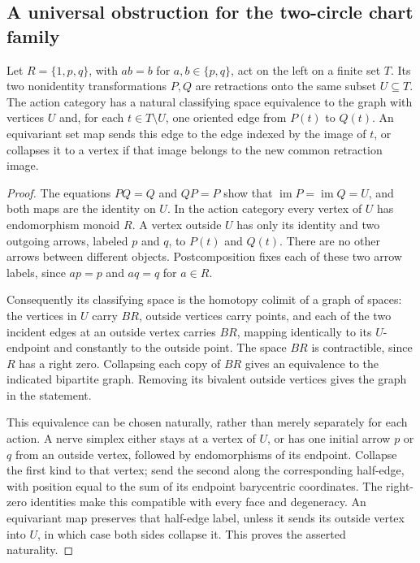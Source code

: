 \subsection{A universal obstruction for the two-circle chart family}

\begin{lemma}
\label{C:right-zero-action-graph}
Let $R=\{1,p,q\}$, with $ab=b$ for $a,b\in\{p,q\}$,
act on the left on a finite set $T$.  Its two nonidentity
transformations $P,Q$ are retractions onto the same subset
$U\subseteq T$.  The action category has a natural classifying
space equivalence to the graph with vertices $U$ and, for each
$t\in T\setminus U$, one oriented edge from $P(t)$ to $Q(t)$.
An equivariant set map sends this edge to the edge indexed by
the image of $t$, or collapses it to a vertex if that image
belongs to the new common retraction image.
\end{lemma}
\begin{proof}
The equations $PQ=Q$ and $QP=P$ show that
$\operatorname{im}P=\operatorname{im}Q=U$, and both maps
are the identity on $U$.  In the action category every vertex
of $U$ has endomorphism monoid $R$.  A vertex outside $U$ has
only its identity and two outgoing arrows, labeled $p$ and $q$,
to $P(t)$ and $Q(t)$.  There are no other arrows between
different objects.  Postcomposition fixes each of these two
arrow labels, since $ap=p$ and $aq=q$ for $a\in R$.

Consequently its classifying space is the homotopy colimit of
a graph of spaces: the vertices in $U$ carry $BR$, outside
vertices carry points, and each of the two incident edges at
an outside vertex carries $BR$, mapping identically to its
$U$-endpoint and constantly to the outside point.  The space
$BR$ is contractible, since $R$ has a right zero.  Collapsing
each copy of $BR$ gives an equivalence to the indicated
bipartite graph.  Removing its bivalent outside vertices gives
the graph in the statement.

This equivalence can be chosen naturally, rather than merely
separately for each action.  A nerve simplex either stays at a
vertex of $U$, or has one initial arrow $p$ or $q$ from an
outside vertex, followed by endomorphisms of its endpoint.
Collapse the first kind to that vertex; send the second along
the corresponding half-edge, with position equal to the sum
of its endpoint barycentric coordinates.  The right-zero
identities make this compatible with every face and degeneracy.
An equivariant map preserves that half-edge label, unless it
sends its outside vertex into $U$, in which case both sides
collapse it.  This proves the asserted naturality.
\end{proof}

